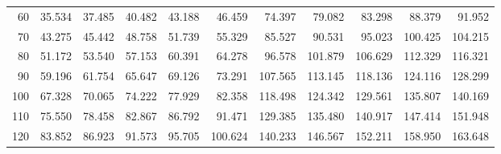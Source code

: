 \begin{tabular}{|r|*{10}{r}|}
60 & 35.534 & 37.485 & 40.482 & 43.188 & 46.459 & 74.397 & 79.082 & 83.298 & 88.379 & 91.952 \\ 
70 &  43.275 &  45.442 &  48.758 &  51.739 &  55.329 &  85.527 &  90.531 &  95.023 & 100.425 & 104.215 \\ 
80 &  51.172 &  53.540 &  57.153 &  60.391 &  64.278 &  96.578 & 101.879 & 106.629 & 112.329 & 116.321 \\ 
90 &  59.196 &  61.754 &  65.647 &  69.126 &  73.291 & 107.565 & 113.145 & 118.136 & 124.116 & 128.299 \\ 
100 &  67.328 &  70.065 &  74.222 &  77.929 &  82.358 & 118.498 & 124.342 & 129.561 & 135.807 & 140.169 \\ 
110 &  75.550 &  78.458 &  82.867 &  86.792 &  91.471 & 129.385 & 135.480 & 140.917 & 147.414 & 151.948 \\ 
120 &  83.852 &  86.923 &  91.573 &  95.705 & 100.624 & 140.233 & 146.567 & 152.211 & 158.950 & 163.648 \\ 
\hline 
\end{tabular}


\newpage 



